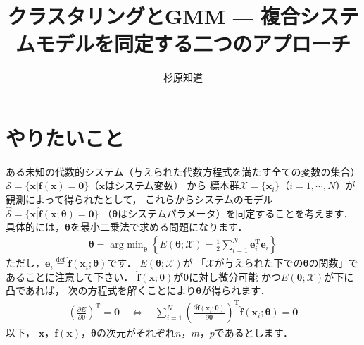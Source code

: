 ﻿\documentclass{jsarticle}
\title{\Large {\bf クラスタリングとGMM ― 複合システムモデルを同定する二つのアプローチ}}
\author{杉原知道}
\begin{document}

\maketitle

\section{やりたいこと}

ある未知の代数的システム（与えられた代数方程式を満たす全ての変数の集合）
$\mathcal{S}=\{\bm{x}|\bm{f}(\bm{x})=\bm{0}\}$（$\bm{x}$はシステム変数）
から
標本群$\mathcal{X}=\{\bm{x}_{i}\}$（$i=1,\cdots,N$）が観測によって得られたとして，
これらからシステムのモデル$\hat{\mathcal{S}}=\{\bm{x}|\hat{\bm{f}}(\bm{x};\bm{\theta})=\bm{0}\}$
（$\bm{\theta}$はシステムパラメータ）を同定することを考えます．
具体的には，$\bm{\theta}$を最小二乗法で求める問題になります．
\begin{align*}
\bm{\theta}=\mathop{\mathrm{arg~min}}_{\bm{\theta}}
\left\{
E(\bm{\theta};\mathcal{X})=\frac{1}{2}\sum_{i=1}^{N}\bm{e}_{i}^{\mathrm{T}}\bm{e}_{i}
\right\}
\end{align*}
ただし，$\bm{e}_{i}\overset{\mathrm{def}}{=}\hat{\bm{f}}(\bm{x}_{i};\bm{\theta})$です．
$E(\bm{\theta};\mathcal{X})$が
「$\mathcal{X}$が与えられた下での$\bm{\theta}$の関数」であることに注意して下さい．
$\hat{\bm{f}}(\bm{x};\bm{\theta})$が$\bm{\theta}$に対し微分可能
かつ$E(\bm{\theta};\mathcal{X})$が下に凸であれば，
次の方程式を解くことにより$\bm{\theta}$が得られます．
\begin{align*}
\left(\frac{\partial E}{\partial\bm{\theta}}\right)^{\mathrm{T}}=\bm{0}
\quad\Leftrightarrow\quad
\sum_{i=1}^{N}\left(\frac{\partial\hat{\bm{f}}(\bm{x}_{i};\bm{\theta})}{\partial\bm{\theta}}\right)^{\mathrm{T}}\hat{\bm{f}}(\bm{x}_{i};\bm{\theta})=\bm{0}
\end{align*}
以下，
$\bm{x}$，$\bm{f}(\bm{x})$，$\bm{\theta}$の次元がそれぞれ$n$，$m$，$p$であるとします．
\end{document}
